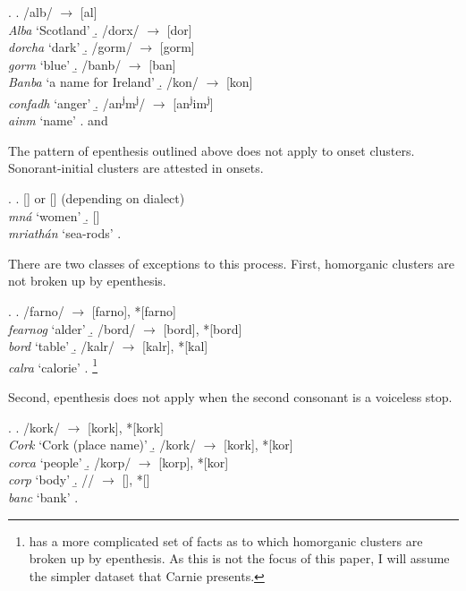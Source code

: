 \documentclass[12pt]{article}
\begin{document}
\ex. \a. /alb/ $\rightarrow$ [al] \\
         {\it Alba} `Scotland'
     \b. /dorx/ $\rightarrow$ [dor] \\
         {\it dorcha} `dark'
     \b. /gorm/  $\rightarrow$  [gorm] \\
         {\it gorm} `blue'
     \b. /banb/ $\rightarrow$ [ban] \\
         {\it Banba} `a name for Ireland'
     \b. /kon/ $\rightarrow$ [kon] \\
         {\it confadh} `anger'
     \b. /an\textsuperscript{j}m\textsuperscript{j}/ $\rightarrow$ [an\textsuperscript{j}im\textsuperscript{j}] \\
         {\it ainm} `name'
     \z.
     \citep[(37)]{carnie.1994} and \citep[(2)]{ni.chiosain.1999}

The pattern of epenthesis outlined above does not apply to onset clusters.  Sonorant-initial clusters
are attested in onsets.

\ex. \a. [] or [] (depending on dialect) \\
         {\it mn\'a} `women'
     \b. [] \\
         {\it mriath\'an} `sea-rods'
     \z.
     \citep[456]{swingle.1992}

There are two classes of exceptions to this process.  First, homorganic clusters are not broken up by epenthesis.

\ex. \a. /farno/ $\rightarrow$ [farno], *[farno] \\
         {\it fearnog} `alder'
     \b. /bord/ $\rightarrow$ [bord], *[bord] \\
         {\it bord} `table'
     \b. /kalr/ $\rightarrow$ [kalr], *[kal] \\
         {\it calra} `calorie'  
     \z. 
     \citep[(52)]{carnie.1994}\footnote{\citet{ni.chiosain.1999} has a more complicated set of facts as to which homorganic clusters are broken up by epenthesis. As this is not the focus of this paper, I will assume the simpler dataset that Carnie presents.}

Second, epenthesis does not apply when the second consonant is a voiceless stop.

\ex. \a. /kork/ $\rightarrow$ [kork], *[kork] \\
         {\it Cork} `Cork (place name)' 
     \b. /kork/ $\rightarrow$ [kork], *[kor] \\
         {\it corca} `people' 
     \b. /korp/  $\rightarrow$ [korp], *[kor] \\
         {\it corp} `body' 
     \b. // $\rightarrow$ [], *[] \\
         {\it banc} `bank'
     \z.
     \citep[(39a,b,c,26c)]{carnie.1994}
\end{document}
